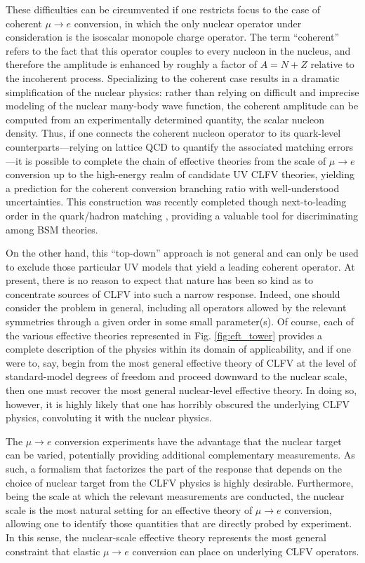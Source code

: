 \documentclass[12pt,letterpaper]{book}
\begin{document}
These difficulties can be circumvented if one restricts focus to the case of coherent $\mu\rightarrow e$ conversion, in which the only nuclear operator under consideration is the isoscalar monopole charge operator. The term ``coherent'' refers to the fact that this operator couples to every nucleon in the nucleus, and therefore the amplitude is enhanced by roughly a factor of $A=N+Z$ relative to the incoherent process. Specializing to the coherent case results in a dramatic simplification of the nuclear physics: rather than relying on difficult and imprecise modeling of the nuclear many-body wave function, the coherent amplitude can be computed from an experimentally determined quantity, the scalar nucleon density. Thus, if one connects the coherent nucleon operator to its quark-level counterparts---relying on lattice QCD to quantify the associated matching errors---it is possible to complete the chain of effective theories from the scale of $\mu\rightarrow e$ conversion up to the high-energy realm of candidate UV CLFV theories, yielding a prediction for the coherent conversion branching ratio with well-understood uncertainties. This construction was recently completed though next-to-leading order in the quark/hadron matching \cite{2018PhRvC..98a5208B,Cirigliano:2022ekw}, providing a valuable tool for discriminating among BSM theories.

On the other hand, this ``top-down'' approach is not general and can only be used to exclude those particular UV models that yield a leading coherent operator. At present, there is no reason to expect that nature has been so kind as to concentrate sources of CLFV into such a narrow response. Indeed, one should consider the problem in general, including all operators allowed by the relevant symmetries through a given order in some small parameter(s). Of course, each of the various effective theories represented in Fig. \ref{fig:eft_tower} provides a complete description of the physics within its domain of applicability, and if one were to, say, begin from the most general effective theory of CLFV at the level of standard-model degrees of freedom and proceed downward to the nuclear scale, then one must recover the most general nuclear-level effective theory. In doing so, however, it is highly likely that one has horribly obscured the underlying CLFV physics, convoluting it with the nuclear physics. 

The $\mu\rightarrow e$ conversion experiments have the advantage that the nuclear target can be varied, potentially providing additional complementary measurements. As such, a formalism that factorizes the part of the response that depends on the choice of nuclear target from the CLFV physics is highly desirable. Furthermore, being the scale at which the relevant measurements are conducted, the nuclear scale is the most natural setting for an effective theory of $\mu\rightarrow e$ conversion, allowing one to identify those quantities that are directly probed by experiment. In this sense, the nuclear-scale effective theory represents the most general constraint that elastic $\mu\rightarrow e$ conversion can place on underlying CLFV operators.
\end{document}
